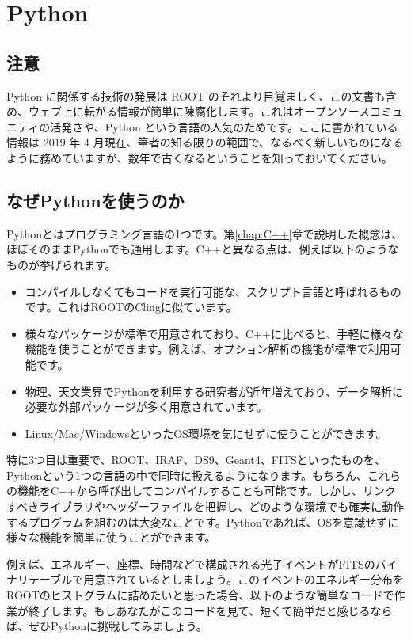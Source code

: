 \chapter{Python}
\label{chap:Python}

\section{注意}
Python に関係する技術の発展は ROOT のそれより目覚ましく、この文書も含め、ウェブ上に転がる情報が簡単に陳腐化します。これはオープンソースコミュニティの活発さや、Python という言語の人気のためです。ここに書かれている情報は 2019 年 4 月現在、筆者の知る限りの範囲で、なるべく新しいものになるように務めていますが、数年で古くなるということを知っておいてください。

\section{なぜPythonを使うのか}

Pythonとはプログラミング言語の1つです。第\ref{chap:C++}章で説明した概念は、ほぼそのままPythonでも通用します。C++と異なる点は、例えば以下のようなものが挙げられます。
\begin{itemize}
  \item コンパイルしなくてもコードを実行可能な、スクリプト言語と呼ばれるものです。これはROOTのClingに似ています。
  \item 様々なパッケージが標準で用意されており、C++に比べると、手軽に様々な機能を使うことができます。例えば、オプション解析の機能が標準で利用可能です。
  \item 物理、天文業界でPythonを利用する研究者が近年増えており、データ解析に必要な外部パッケージが多く用意されています。
  \item Linux/Mac/WindowsといったOS環境を気にせずに使うことができます。
\end{itemize}
特に3つ目は重要で、ROOT、IRAF、DS9、Geant4、FITSといったものを、Pythonという1つの言語の中で同時に扱えるようになります。もちろん、これらの機能をC++から呼び出してコンパイルすることも可能です。しかし、リンクすべきライブラリやヘッダーファイルを把握し、どのような環境でも確実に動作するプログラムを組むのは大変なことです。Pythonであれば、OSを意識せずに様々な機能を簡単に使うことができます。

例えば、エネルギー、座標、時間などで構成される光子イベントがFITSのバイナリテーブルで用意されているとしましょう。このイベントのエネルギー分布をROOTのヒストグラムに詰めたいと思った場合、以下のような簡単なコードで作業が終了します。もしあなたがこのコードを見て、短くて簡単だと感じるならば、ぜひPythonに挑戦してみましょう。

